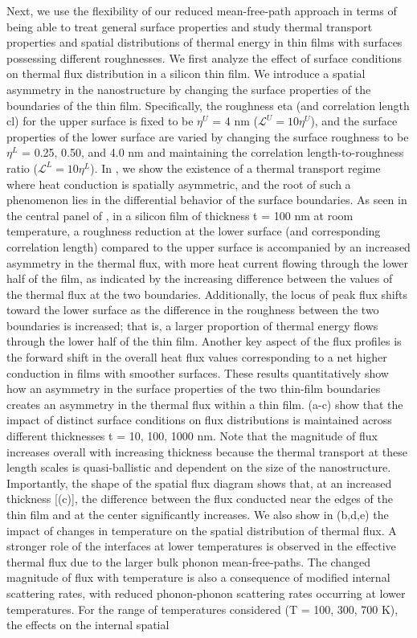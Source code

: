 Next, we use the flexibility of our reduced mean-free-path approach in terms of being able to treat general surface properties and study thermal transport properties and spatial distributions of thermal energy in thin films with surfaces possessing different roughnesses. We first analyze the effect of surface conditions on thermal flux distribution in a silicon thin film. We introduce a spatial asymmetry in the nanostructure by changing the surface properties of the boundaries of the thin film. Specifically, the roughness \gls{eta} (and correlation length \gls{cl}) for the upper surface is fixed to be $\eta^U$ = 4 nm ($\mathcal{L}^U = 10\eta^U$), and the surface properties of the lower surface are varied by changing the surface roughness to be $\eta^L$ = 0.25, 0.50, and 4.0 nm and maintaining the correlation length-to-roughness ratio ($\mathcal{L}^L = 10\eta^L$). In , we show the existence of a thermal transport regime where heat conduction is spatially asymmetric, and the root of such a phenomenon lies in the differential behavior of the surface boundaries. As seen in the central panel of , in a silicon film of thickness \gls{t} = 100 nm at room temperature, a roughness reduction at the lower surface (and corresponding correlation length) compared to the upper surface is accompanied by an increased asymmetry in the thermal flux, with more heat current flowing through the lower half of the film, as indicated by the increasing difference between the values of the thermal flux at the two boundaries. Additionally, the locus of peak flux shifts toward the lower surface as the difference in the roughness between the two boundaries is increased; that is, a larger proportion of thermal energy flows through the lower half of the thin film. Another key aspect of the flux profiles is the forward shift in the overall heat flux values corresponding to a net higher conduction in films with smoother surfaces. These results quantitatively show how an asymmetry in the surface properties of the two thin-film boundaries creates an asymmetry in the thermal flux within a thin film. (a-c) show that the impact of distinct surface conditions on flux distributions is maintained across different thicknesses \gls{t} = 10, 100, 1000 nm. Note that the magnitude of flux increases overall with increasing thickness because the thermal transport at these length scales is quasi-ballistic and dependent on the size of the nanostructure. Importantly, the shape of the spatial flux diagram shows that, at an increased thickness [(c)], the difference between the flux conducted near the edges of the thin film and at the center significantly increases. We also show in (b,d,e) the impact of changes in temperature on the spatial distribution of thermal flux. A stronger role of the interfaces at lower temperatures is observed in the effective thermal flux due to the larger bulk phonon mean-free-paths. The changed magnitude of flux with temperature is also a consequence of modified internal scattering rates, with reduced phonon-phonon scattering rates occurring at lower temperatures. For the range of temperatures considered (\gls{T} = 100, 300, 700 K), the effects on the internal spatial 